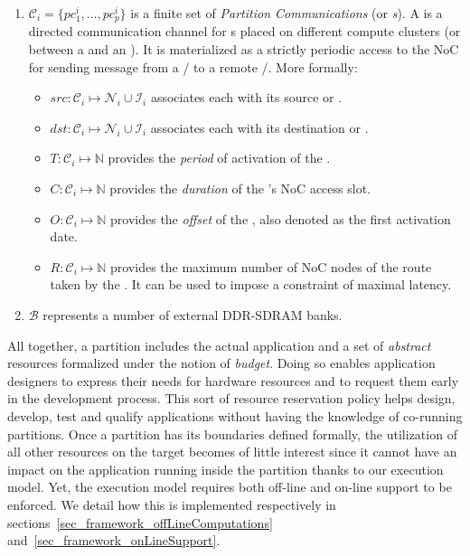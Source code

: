 \documentclass[main.tex]{subfiles}
\begin{document}
\begin{enumerate}
        \item $\mathcal{C}_i = \{ pc_1^i , \ldots , pc_p^i \}$ is a finite set of \emph{Partition Communications} (or \emph{\PC{}s}). A \PC{} is a directed communication channel for \PN{}s placed on different compute clusters (or between a \PN{} and an \ION{}). It is materialized as a strictly periodic access to the NoC for sending message from a \PN{}/\ION{} to a remote \PN{}/\ION{}. More formally:
            \begin{itemize}
                \item $src : \mathcal{C}_i \mapsto \mathcal{N}_i \cup \mathcal{I}_i$ associates each \PC{} with its source \PN{} or \ION{}.
                \item $dst : \mathcal{C}_i \mapsto \mathcal{N}_i \cup \mathcal{I}_i$ associates each \PC{} with its destination \PN{} or \ION{}.
                \item $T : \mathcal{C}_i \mapsto \mathbb{N}$ provides the \emph{period} of activation of the \PC{}.
                \item $C : \mathcal{C}_i \mapsto \mathbb{N}$ provides the \emph{duration} of the \PC{}'s NoC access slot.
                \item $O : \mathcal{C}_i \mapsto \mathbb{N}$ provides the \emph{offset} of the \PC{}, also denoted as the first activation date.
                \item $R : \mathcal{C}_i \mapsto \mathbb{N}$ provides the maximum number of NoC nodes of the route taken by the \PC{}. It can be used to impose a constraint of maximal latency.

            \end{itemize}

        \item $\mathcal{B}$ represents a number of external DDR-SDRAM banks.
    \end{enumerate}

    All together, a partition includes the actual application and a set of \emph{abstract} resources formalized under the notion of \emph{budget}. Doing so enables application designers to express their needs for hardware resources and to request them early in the development process. This sort of resource reservation policy helps design, develop, test and qualify applications without having the knowledge of co-running partitions. Once a partition has its boundaries defined formally, the utilization of all other resources on the target becomes of little interest since it cannot have an impact on the application running inside the partition thanks to our execution model. Yet, the execution model requires both off-line and on-line support to be enforced. We detail how this is implemented respectively in sections~\ref{sec_framework_offLineComputations} and~\ref{sec_framework_onLineSupport}.
\end{document}

